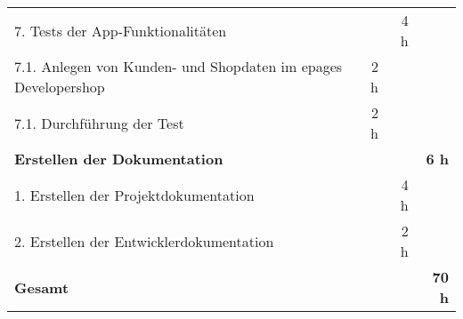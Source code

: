 \begin{tabularx}{\textwidth}{Xrrr}
7. Tests der App-Funktionalitäten &       & 4 h   &  \\
\rowcolor{odd}7.1. Anlegen von Kunden- und Shopdaten im epages Developershop & 2 h   &       &  \\
7.1. Durchführung der Test & 2 h   &       &  \\
\rowcolor{heading}\textbf{Erstellen der Dokumentation} & \textbf{} & \textbf{} & \textbf{6 h} \\
1. Erstellen der Projektdokumentation &       & 4 h   &  \\
\rowcolor{odd}2. Erstellen der Entwicklerdokumentation &       & 2 h   &  \\
\hline
\hline
\rowcolor{heading}\textbf{Gesamt} & \textbf{} & \textbf{} & \textbf{70 h} \\
\end{tabularx}
